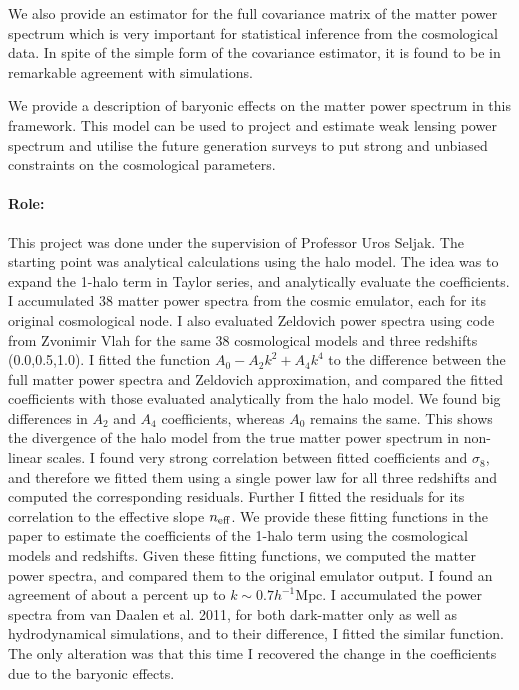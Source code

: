 \documentclass[
  11pt,
  twoside,
  openright,
  titlepage,
  headings=optiontoheadandtoc
]{scrbook}
\begin{document}
We also provide an estimator for the full covariance matrix of the matter power
spectrum which is very important for statistical inference from the cosmological
data. In spite of the simple form of the covariance estimator, it is found
to be in remarkable agreement with simulations. 

We provide a description of baryonic effects on the matter
power spectrum in this framework. This model can be used to project and estimate
weak lensing power spectrum and utilise the future generation surveys
to put strong and unbiased constraints on the cosmological parameters.

\paragraph{Role:} This project was done under the supervision of Professor Uros Seljak. 
The starting point was analytical calculations using the halo model. The
idea was to expand the 1-halo term in Taylor series, and analytically
evaluate the coefficients. I accumulated 38 matter power spectra
from the cosmic emulator, each for its original cosmological node. I
also evaluated Zeldovich power spectra using code from Zvonimir Vlah
for the same 38 cosmological models and three redshifts (0.0,0.5,1.0).
I fitted the function $A_0 - A_2k^2 + A_4k^4$ to the difference between 
the full matter power spectra and Zeldovich
approximation, and compared
the fitted coefficients with those evaluated analytically from the halo model. 
We found big differences in $A_2$ and $A_4$ coefficients, whereas
$A_0$ remains the same. This shows the divergence of the halo model
from the true matter power spectrum in non-linear scales. 
I found very strong correlation between fitted coefficients and $\sigma_8$,
and therefore we fitted them using a single power law for all three redshifts
and computed the corresponding residuals. 
Further I fitted the residuals for its correlation to the 
effective slope $n_{\rm eff}$.
We provide these fitting functions in the paper to estimate the 
coefficients of the 1-halo term using the cosmological models
and redshifts. Given these fitting functions, we computed the matter
power spectra, and compared them to the original emulator output. 
I found an agreement of about a percent up to $k\sim 0.7 h^{-1}\mathrm{Mpc}$.
I accumulated the power spectra from van Daalen et al. 2011, for both
dark-matter only as well as hydrodynamical simulations, 
and to their difference, I fitted the similar function. 
The only alteration was that this time I 
recovered the change in the coefficients due to the baryonic effects. 
\end{document}
